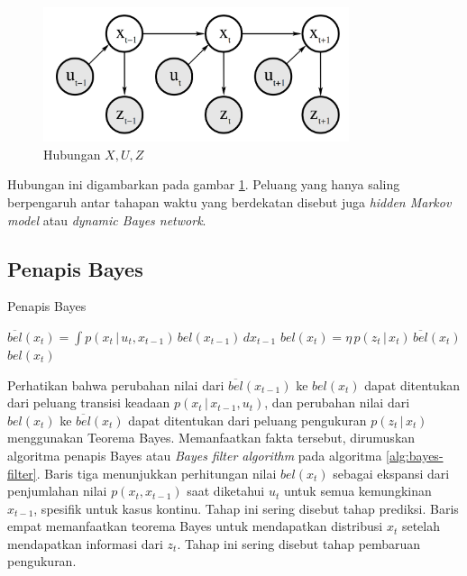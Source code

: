 \begin{figure}[h]
    \centering
    \includegraphics[width=0.8\textwidth]{resources/hidden-markov-model.png}
    \caption{Hubungan $X, U, Z$}
    \label{fig:hidden-markov-model}
\end{figure}

Hubungan ini digambarkan pada gambar \ref{fig:hidden-markov-model}. Peluang yang hanya saling berpengaruh antar tahapan waktu yang berdekatan disebut juga \textit{hidden Markov model} atau \textit{dynamic Bayes network}.

\subsection{Penapis Bayes}

\begin{algorithm}
    \caption{Penapis Bayes}
    \label{alg:bayes-filter}
    \begin{algorithmic}[1]
        \State $\overline{bel}(x_t) = \int p(x_t \,|\, u_t, x_{t-1})\, bel(x_{t-1})\, dx_{t-1}$
        \State $bel(x_t) = \eta\, p(z_t \,|\, x_t)\, \overline{bel}(x_t)$ 
        \EndFor
        \State \Return $bel(x_t)$
        \EndFunction
    \end{algorithmic}
\end{algorithm}

Perhatikan bahwa perubahan nilai dari $\overline{bel}(x_{t-1})$ ke $bel(x_t)$ dapat ditentukan dari peluang transisi keadaan $p(x_t \,|\, x_{t-1}, u_t)$, dan perubahan nilai dari $bel(x_t)$ ke $\overline{bel}(x_t)$ dapat ditentukan dari peluang pengukuran $p(z_t \,|\, x_t)$ menggunakan Teorema Bayes. Memanfaatkan fakta tersebut, dirumuskan algoritma penapis Bayes atau \textit{Bayes filter algorithm} pada algoritma \ref{alg:bayes-filter}. Baris tiga menunjukkan perhitungan nilai $bel(x_t)$ sebagai ekspansi dari penjumlahan nilai $p(x_t, x_{t-1})$ saat diketahui $u_t$ untuk semua kemungkinan $x_{t-1}$, spesifik untuk kasus kontinu. Tahap ini sering disebut tahap prediksi. Baris empat memanfaatkan teorema Bayes untuk mendapatkan distribusi $x_t$ setelah mendapatkan informasi dari $z_t$. Tahap ini sering disebut tahap pembaruan pengukuran.

